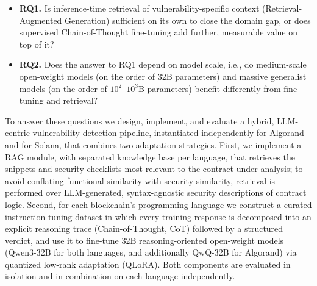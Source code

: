 \documentclass[lettersize,journal]{IEEEtran}
\begin{document}
\begin{itemize}
    \item \textbf{RQ1.} Is inference-time retrieval of vulnerability-specific context
    (Retrieval-Augmented Generation) sufficient on its own to close the domain gap,
    or does supervised Chain-of-Thought fine-tuning add further, measurable value on top of it?
    \item \textbf{RQ2.} Does the answer to RQ1 depend on model scale, i.e., do
     medium-scale open-weight models (on the order of 32B parameters) and massive 
     generalist models (on the order of $10^{2}$--$10^{3}$B parameters) benefit differently 
     from fine-tuning and retrieval?
\end{itemize}

To answer these questions we design, implement,
and evaluate a hybrid, LLM-centric vulnerability-detection pipeline, instantiated independently
for Algorand and for Solana, that combines two adaptation strategies. First, we implement a RAG
module, with separated knowledge base per language, that retrieves the snippets and security
checklists most relevant to the contract under analysis; to avoid conflating functional similarity
with security similarity, retrieval is performed over LLM-generated, syntax-agnostic security
descriptions of contract logic. Second, for each blockchain's programming language we construct a
curated instruction-tuning dataset in which every training response is decomposed into an explicit
reasoning trace (Chain-of-Thought, CoT) followed by a structured verdict, and use it to fine-tune
32B reasoning-oriented open-weight models (Qwen3-32B for both languages, and additionally QwQ-32B
for Algorand) via quantized low-rank adaptation (QLoRA). Both components are evaluated in isolation
and in combination on each language independently.
\end{document}
